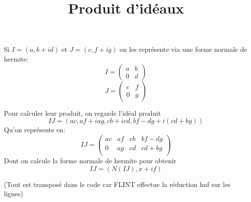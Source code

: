 \documentclass[12pt]{article}
\theoremstyle{plain}
\theoremstyle{definition}
\begin{document}
\title{Produit d'idéaux}
\maketitle
Si $I=(a, b+id)$ et $J=(c, f+ig)$ on les représente via une forme normale de hermite:
\[
    I=\begin{pmatrix}a & b\\ 0&d\end{pmatrix}
\]
\[
    J=\begin{pmatrix}c & f\\ 0&g\end{pmatrix}
\]

Pour calculer leur produit, on regarde l'idéal produit 
\[
    IJ=(ac, af+iag, cb+icd, bf-dg+i(cd+bg))
\]
Qu'on représente en:
\[
    IJ=\begin{pmatrix}ac & af & cb & bf-dg\\
        0 & ag & cd & cd+bg\\
    \end{pmatrix}
\]
Dont on calcule la forme normale de hermite pour obtenir 
\[IJ=(N(IJ), x+if)\]

(Tout est transposé dans le code car FLINT effectue la réduction 
hnf sur les lignes)
\end{document}
